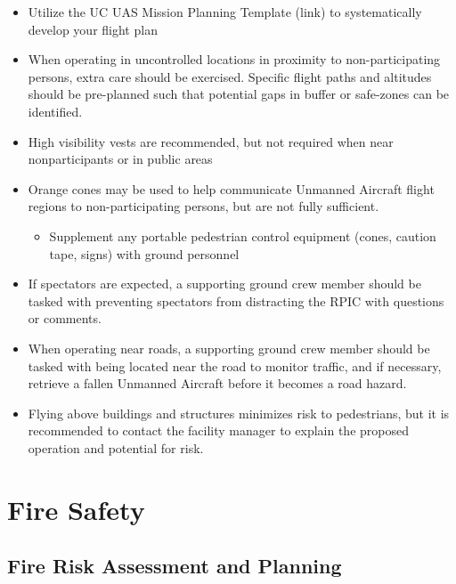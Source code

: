 \documentclass[
]{book}
\providecommand{\tightlist}{%
  \setlength{\itemsep}{0pt}\setlength{\parskip}{0pt}}
\begin{document}
\begin{itemize}
\tightlist
\item
  Utilize the UC UAS Mission Planning Template (link) to systematically develop your flight plan
\item
  When operating in uncontrolled locations in proximity to non-participating persons, extra care should be exercised. Specific flight paths and altitudes should be pre-planned such that potential gaps in buffer or safe-zones can be identified.
\item
  High visibility vests are recommended, but not required when near nonparticipants or in public areas
\item
  Orange cones may be used to help communicate Unmanned Aircraft flight regions to non-participating persons, but are not fully sufficient.

  \begin{itemize}
  \tightlist
  \item
    Supplement any portable pedestrian control equipment (cones, caution tape, signs) with ground personnel
  \end{itemize}
\item
  If spectators are expected, a supporting ground crew member should be tasked with preventing spectators from distracting the RPIC with questions or comments.
\item
  When operating near roads, a supporting ground crew member should be tasked with being located near the road to monitor traffic, and if necessary, retrieve a fallen Unmanned Aircraft before it becomes a road hazard.
\item
  Flying above buildings and structures minimizes risk to pedestrians, but it is recommended to contact the facility manager to explain the proposed operation and potential for risk.
\end{itemize}

\hypertarget{ch-fire-safety}{%
\chapter{Fire Safety}\label{ch-fire-safety}}

\hypertarget{fire-risk-assessment-and-planning}{%
\section{Fire Risk Assessment and Planning}\label{fire-risk-assessment-and-planning}}
\end{document}
